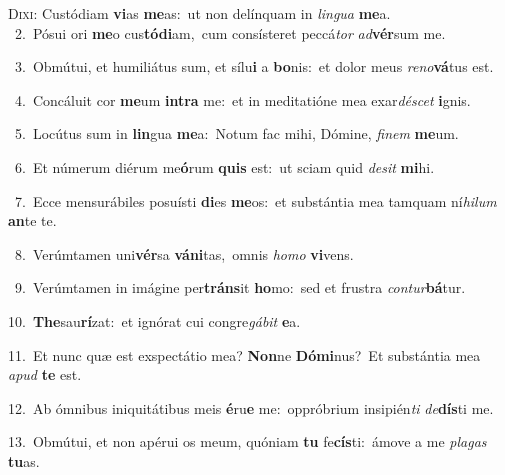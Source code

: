 \lettrine{\initial\textcolor{\initialcolor}{D}}{ixi:} Custódiam \textbf{vi}\-as \textbf{me}\-as:~\star ut non delínquam in \textit{lin}\-\textit{gua} \textbf{me}\-a.\\
{\numbfont\textcolor{\numbcolor}{~2.}}~Pósui ori \textbf{me}\-o cus\-\textbf{tó}\-\textbf{di}am,~\star cum consísteret peccá\textit{tor} \textit{ad}\-\textbf{vér}sum me.\par
{\numbfont\textcolor{\numbcolor}{~3.}}~Obmútui, et humiliátus sum, et sílu\textbf{i} a \textbf{bo}\-nis:~\star et dolor meus \textit{re}\-\textit{no}\textbf{vá}tus est.\par
{\numbfont\textcolor{\numbcolor}{~4.}}~Concáluit cor \textbf{me}\-um \textbf{in}\-\textbf{tra} me:~\star et in meditatióne mea exar\-\textit{dé}\-\textit{scet} \textbf{i}\-gnis.\par
{\numbfont\textcolor{\numbcolor}{~5.}}~Locútus sum in \textbf{lin}\-gua \textbf{me}\-a:~\star Notum fac mihi, Dómine, \textit{fi}\-\textit{nem} \textbf{me}\-um.\par
{\numbfont\textcolor{\numbcolor}{~6.}}~Et númerum diérum me\-\textbf{ó}\-rum \textbf{quis} est:~\star ut sciam quid \textit{de}\-\textit{sit} \textbf{mi}\-hi.\par
{\numbfont\textcolor{\numbcolor}{~7.}}~Ecce mensurábiles posuísti \textbf{di}\-es \textbf{me}\-os:~\star et substántia mea tamquam ní\-\textit{hi}\-\textit{lum} \textbf{an}\-te te.\par
{\numbfont\textcolor{\numbcolor}{~8.}}~Verúmtamen uni\-\textbf{vér}\-sa \textbf{vá}\-\textbf{ni}tas,~\star omnis \textit{ho}\-\textit{mo} \textbf{vi}\-vens.\par
{\numbfont\textcolor{\numbcolor}{~9.}}~Verúmtamen in imágine per\-\textbf{tráns}\-it \textbf{ho}\-mo:~\star sed et frustra \textit{con}\-\textit{tur}\textbf{bá}tur.\par
{\numbfont\textcolor{\numbcolor}{10.}}~\-\textbf{The}\-sau\-\textbf{rí}\-zat:~\star et ignórat cui congre\-\textit{gá}\-\textit{bit} \textbf{e}\-a.\par
{\numbfont\textcolor{\numbcolor}{11.}}~Et nunc quæ est exspectátio mea? \textbf{Non}\-ne \textbf{Dó}\-\textbf{mi}nus?~\star Et substántia mea \textit{a}\-\textit{pud} \textbf{te} est.\par
{\numbfont\textcolor{\numbcolor}{12.}}~Ab ómnibus iniquitátibus meis \textbf{é}\-ru\textbf{e} me:~\star oppróbrium insipién\textit{ti} \textit{de}\-\textbf{dís}ti me.\par
{\numbfont\textcolor{\numbcolor}{13.}}~Obmútui, et non apérui os meum, quóniam \textbf{tu} fe\-\textbf{cís}\-ti:~\star ámove a me \textit{pla}\-\textit{gas} \textbf{tu}\-as.\par
